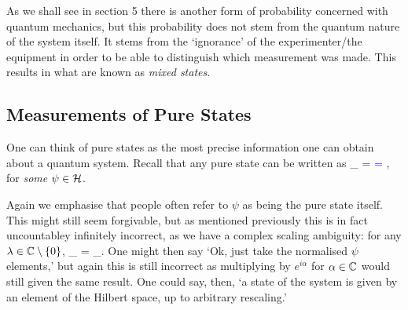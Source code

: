 As we shall see in section 5 there is another form of probability concerned with quantum mechanics, but this probability does not stem from the quantum nature of the system itself. It stems from the `ignorance' of the experimenter/the equipment in order to be able to distinguish which measurement was made. This results in what are known as \emph{mixed states}.
\er 

\subsection{Measurements of Pure States}
One can think of pure states as the most precise information one can obtain about a quantum system. Recall that any pure state can be written as 
\bse 
\rho_{\psi} = \frac{\braket{\psi}{\cdot}}{\braket{\psi}{\psi}} \textcolor{blue}{= \frac{\ket{\psi}\bra{\psi}}{\braket{\psi}{\psi}}},
\ese 
for \emph{some} $\psi\in\mathcal{H}$.

\br
Again we emphasise that people often refer to $\psi$ as being the pure state itself. This might still seem forgivable, but as mentioned previously this is in fact uncountabley infinitely incorrect, as we have a complex scaling ambiguity: for any $\lambda \in \mathbb{C}\setminus\{0\}$,
\bse 
\rho_{\lambda\psi} = \rho_{\psi}.
\ese 
One might then say `Ok, just take the normalised $\psi$ elements,' but again this is still incorrect as multiplying by $e^{i\alpha}$ for $\alpha\in\mathbb{C}$ would still given the same result. One could say, then, `a state of the system is given by an element of the Hilbert space, up to arbitrary rescaling.'
\er 

